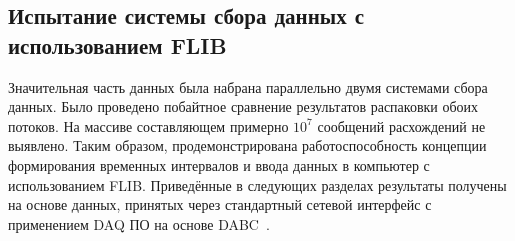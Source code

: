 \subsection{Испытание системы сбора данных с использованием FLIB}\label{section:flib}

Значительная часть данных была набрана параллельно двумя системами сбора данных. Было проведено побайтное сравнение результатов распаковки обоих потоков. На массиве составляющем примерно $ 10^{7} $ сообщений расхождений не выявлено. Таким образом, продемонстрирована работоспособность концепции формирования временных интервалов и ввода данных в компьютер с использованием FLIB. Приведённые в следующих разделах результаты получены на основе данных, принятых через стандартный сетевой интерфейс с применением DAQ ПО на основе DABC~\cite{DABC}.
